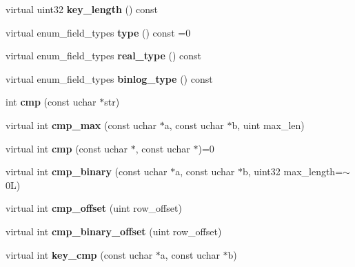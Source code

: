\begin{DoxyCompactItemize}
\item 
\mbox{\label{classField_aadff032e43d519be62ff8f361e20143e}} 
virtual uint32 {\bfseries key\+\_\+length} () const
\item 
\mbox{\label{classField_a5680c238c4fbc95e272832d94ae568b6}} 
virtual enum\+\_\+field\+\_\+types {\bfseries type} () const =0
\item 
\mbox{\label{classField_a05a1532db54273b8dbc3dc34cd38b6ff}} 
virtual enum\+\_\+field\+\_\+types {\bfseries real\+\_\+type} () const
\item 
\mbox{\label{classField_ae4e402a984605241b713f65d6996a577}} 
virtual enum\+\_\+field\+\_\+types {\bfseries binlog\+\_\+type} () const
\item 
\mbox{\label{classField_ad947e711064b9f582d6c3dd555347e9c}} 
int {\bfseries cmp} (const uchar $\ast$str)
\item 
\mbox{\label{classField_a73c1ee1da88babbfc49604588a41e245}} 
virtual int {\bfseries cmp\+\_\+max} (const uchar $\ast$a, const uchar $\ast$b, uint max\+\_\+len)
\item 
\mbox{\label{classField_a18f6ad270e130ee74ebea3b60a054ef5}} 
virtual int {\bfseries cmp} (const uchar $\ast$, const uchar $\ast$)=0
\item 
\mbox{\label{classField_a1510621d16131c570a1151276187f214}} 
virtual int {\bfseries cmp\+\_\+binary} (const uchar $\ast$a, const uchar $\ast$b, uint32 max\+\_\+length=$\sim$0\+L)
\item 
\mbox{\label{classField_ac6ca635180ebc5ebad8ddc712744613c}} 
virtual int {\bfseries cmp\+\_\+offset} (uint row\+\_\+offset)
\item 
\mbox{\label{classField_aea9e022c83822a30361914fd6d131c2d}} 
virtual int {\bfseries cmp\+\_\+binary\+\_\+offset} (uint row\+\_\+offset)
\item 
\mbox{\label{classField_aa132bf93ec8ff22e9435290462d279bb}} 
virtual int {\bfseries key\+\_\+cmp} (const uchar $\ast$a, const uchar $\ast$b)

\end{DoxyCompactItemize}
